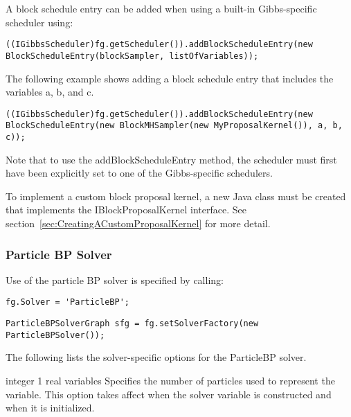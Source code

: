 \fi

\ifjava
A block schedule entry can be added when using a built-in Gibbs-specific scheduler using:

\begin{lstlisting}
((IGibbsScheduler)fg.getScheduler()).addBlockScheduleEntry(new BlockScheduleEntry(blockSampler, listOfVariables));
\end{lstlisting}

The following example shows adding a block schedule entry that includes the variables a, b, and c.

\begin{lstlisting}
((IGibbsScheduler)fg.getScheduler()).addBlockScheduleEntry(new BlockScheduleEntry(new BlockMHSampler(new MyProposalKernel()), a, b, c));
\end{lstlisting}

Note that to use the addBlockScheduleEntry method, the scheduler must first have been explicitly set to one of the Gibbs-specific schedulers.
\fi

To implement a custom block proposal kernel, a new Java class must be created that implements the IBlockProposalKernel interface.  See section~\ref{sec:CreatingACustomProposalKernel} for more detail.

\clearpage
\subsubsection{Particle BP Solver}

Use of the particle BP solver is specified by calling:

\ifmatlab
\begin{lstlisting}
fg.Solver = 'ParticleBP';
\end{lstlisting}
\fi
\ifjava
\begin{lstlisting}
ParticleBPSolverGraph sfg = fg.setSolverFactory(new ParticleBPSolver());
\end{lstlisting}
\fi

The following lists the solver-specific options for the ParticleBP solver.



{integer}
{1}
{real variables}
{Specifies the number of particles used to represent the variable. This option takes affect when the solver variable is constructed and when it is initialized.}

